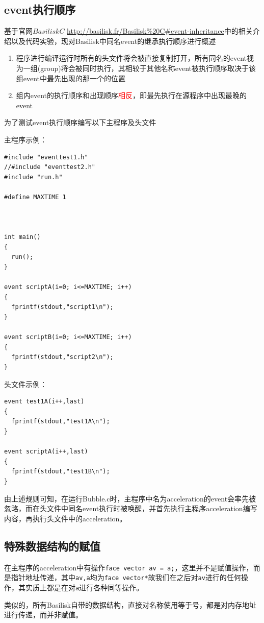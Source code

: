 \documentclass[lang=cn,11pt,a4paper]{elegantpaper}
\begin{document}
\subsection{event执行顺序}
基于官网$Basilisk C$ \url{http://basilisk.fr/Basilisk%20C#event-inheritance}中的相关介绍以及代码实验，现对Basilisk中同名event的继承执行顺序进行概述\par
\begin{enumerate}
    \item 程序进行编译运行时所有的头文件将会被直接复制打开，所有同名的event视为一组(group)将会被同时执行，其相较于其他名称event被执行顺序取决于该组event中最先出现的那一个的位置
    \item 组内event的执行顺序和出现顺序\textcolor{red}{相反}，即最先执行在源程序中出现最晚的event
\end{enumerate}
为了测试event执行顺序编写以下主程序及头文件\par
主程序示例：
\begin{verbatim}
#include "eventtest1.h"
//#include "eventtest2.h"
#include "run.h"

#define MAXTIME 1



int main()
{
  run();
}

event scriptA(i=0; i<=MAXTIME; i++)
{
  fprintf(stdout,"script1\n");
}

event scriptB(i=0; i<=MAXTIME; i++)
{
  fprintf(stdout,"script2\n");
}
\end{verbatim}
头文件示例：
\begin{verbatim}
event test1A(i++,last)
{
  fprintf(stdout,"test1A\n");
}

event scriptA(i++,last)
{
  fprintf(stdout,"test1B\n");
}
\end{verbatim}
由上述规则可知，在运行Bubble.c时，主程序中名为acceleration的event会率先被忽略，而在头文件中同名event执行时被唤醒，并首先执行主程序acceleration编写内容，再执行头文件中的acceleration。
\subsection{特殊数据结构的赋值}
在主程序的acceleration中有操作\texttt{face vector av = a;}，这里并不是赋值操作，而是指针地址传递，其中\texttt{av,a}均为\texttt{face vector*}故我们在之后对\texttt{av}进行的任何操作，其实质上都是在对\texttt{a}进行各种同等操作。\par
类似的，所有Basilisk自带的数据结构，直接对名称使用等于号，都是对内存地址进行传递，而并非赋值。
\end{document}
